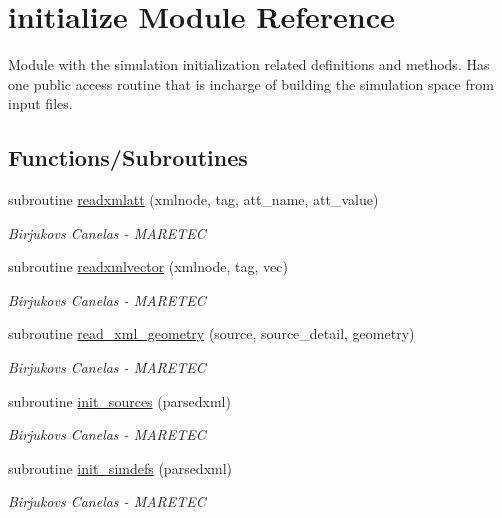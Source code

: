 \hypertarget{namespaceinitialize}{}\section{initialize Module Reference}
\label{namespaceinitialize}


Module with the simulation initialization related definitions and methods. Has one public access routine that is incharge of building the simulation space from input files.  


\subsection*{Functions/\+Subroutines}
\begin{DoxyCompactItemize}
\item 
subroutine \mbox{\hyperlink{namespaceinitialize_aba73c51d0609ff6d0c3bb172f00620e3}{readxmlatt}} (xmlnode, tag, att\+\_\+name, att\+\_\+value)
\begin{DoxyCompactList}\small\item\em Birjukovs Canelas -\/ M\+A\+R\+E\+T\+EC \end{DoxyCompactList}\item 
subroutine \mbox{\hyperlink{namespaceinitialize_af6a2b47aebc09a89d9c795635fa393c6}{readxmlvector}} (xmlnode, tag, vec)
\begin{DoxyCompactList}\small\item\em Birjukovs Canelas -\/ M\+A\+R\+E\+T\+EC \end{DoxyCompactList}\item 
subroutine \mbox{\hyperlink{namespaceinitialize_ad36e4f602dab66c06a1f0e2474e9f0a6}{read\+\_\+xml\+\_\+geometry}} (source, source\+\_\+detail, geometry)
\begin{DoxyCompactList}\small\item\em Birjukovs Canelas -\/ M\+A\+R\+E\+T\+EC \end{DoxyCompactList}\item 
subroutine \mbox{\hyperlink{namespaceinitialize_ad44abf161e353eb8a253ff5c02cd160b}{init\+\_\+sources}} (parsedxml)
\begin{DoxyCompactList}\small\item\em Birjukovs Canelas -\/ M\+A\+R\+E\+T\+EC \end{DoxyCompactList}\item 
subroutine \mbox{\hyperlink{namespaceinitialize_a9bd773485c427abd68ca801c02b1b08c}{init\+\_\+simdefs}} (parsedxml)
\begin{DoxyCompactList}\small\item\em Birjukovs Canelas -\/ M\+A\+R\+E\+T\+EC \end{DoxyCompactList}\item 

\end{DoxyCompactItemize}
